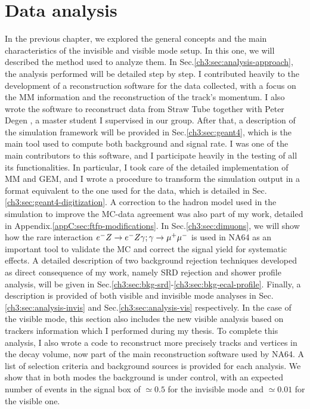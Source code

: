 
\newcommand{\pdirthree}{chapters/plots/chapter3}

\chapter{Data analysis} %
\label{chapter3} %


In the previous chapter, we explored the general concepts and the main characteristics of the invisible and visible mode setup. In this one, we will described the method used to analyze them. In Sec.\ref{ch3:sec:analysis-approach}, the analysis performed will be detailed step by step. I contributed heavily to the development of a reconstruction software for the data collected, with a focus on the MM information and the reconstruction of the track's momentum. I also wrote the software to reconstruct data from Straw Tube together with Peter Degen \cite{pdegen-thesis}, a master student I supervised in our group. After that, a description of the simulation framework will be provided in Sec.\ref{ch3:sec:geant4}, which is the main tool used to compute both background and signal rate. I was one of the main contributors to this software, and I participate heavily in the testing of all its functionalities. In particular, I took care of the detailed implementation of MM and GEM, and I wrote a procedure to transform the simulation output in a format equivalent to the one used for the data, which is detailed in Sec.\ref{ch3:sec:geant4-digitization}. A correction to the hadron model used in the simulation to improve the MC-data agreement was also part of my work, detailed in Appendix.\ref{appC:sec:ftfp-modifications}.
In Sec.\ref{ch3:sec:dimuons}, we will show how the rare interaction $e^- Z \to e^- Z \gamma; \gamma \to \mu^+ \mu^-$ is used in NA64 as an important tool to validate the MC and correct the signal yield for systematic effects.
A detailed description of two background rejection techniques developed as direct consequence of my work, namely SRD rejection and shower profile analysis, will be given in Sec.\ref{ch3:sec:bkg-srd}-\ref{ch3:sec:bkg-ecal-profile}.
Finally, a description is provided of both visible and invisible mode analyses in Sec.\ref{ch3:sec:analysis-invis} and Sec.\ref{ch3:sec:analysis-vis} respectively. In the case of the visible mode, this section also includes the new visible analysis based on trackers information which I performed during my thesis. To complete this analysis, I also wrote a code to reconstruct more precisely tracks and vertices in the decay volume, now part of the main reconstruction software used by NA64.
A list of selection criteria and background sources is provided for each analysis. We show that in both modes the background is under control, with an expected number of events in the signal box of $\simeq 0.5$ for the invisible mode and $\simeq 0.01$ for the visible one.



